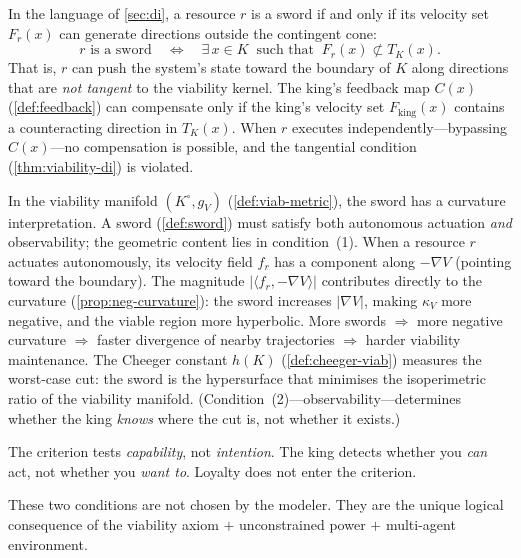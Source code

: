 \begin{remark}\label{rem:sword-di}
In the language of \cref{sec:di}, a resource $r$ is a sword if and
only if its velocity set $F_r(x)$ can generate directions outside
the contingent cone:
\[
  r \text{ is a sword}
  \quad\iff\quad
  \exists\, x \in K \;\;\text{such that}\;\;
  F_r(x) \not\subset T_K(x).
\]
That is, $r$ can push the system's state toward the boundary of $K$
along directions that are \emph{not tangent} to the viability
kernel.  The king's feedback map $C(x)$ (\cref{def:feedback}) can
compensate only if the king's velocity set $F_{\mathrm{king}}(x)$
contains a counteracting direction in $T_K(x)$.  When $r$ executes
independently---bypassing $C(x)$---no compensation is possible,
and the tangential condition (\cref{thm:viability-di}) is violated.
\end{remark}

\begin{remark}
\label{rem:sword-geom}
In the viability manifold $(K^\circ, g_V)$ (\cref{def:viab-metric}),
the sword has a curvature interpretation.  A sword
(\cref{def:sword}) must satisfy both autonomous actuation
\emph{and} observability; the geometric content lies in
condition~(1).  When a resource $r$ actuates autonomously, its
velocity field $f_r$ has a component along $-\nabla V$ (pointing
toward the boundary).  The magnitude
$|\langle f_r, -\nabla V \rangle|$ contributes directly to the
curvature (\cref{prop:neg-curvature}): the sword increases
$|\nabla V|$, making $\kappa_V$ more negative, and the
viable region more hyperbolic.  More swords $\Rightarrow$ more
negative curvature $\Rightarrow$ faster divergence of nearby
trajectories $\Rightarrow$ harder viability maintenance.
The Cheeger constant $h(K)$ (\cref{def:cheeger-viab}) measures
the worst-case cut: the sword is the hypersurface that minimises the
isoperimetric ratio of the viability manifold.
(Condition~(2)---observability---determines whether the king
\emph{knows} where the cut is, not whether it exists.)
\end{remark}

\begin{remark}\label{rem:intent}
The criterion tests \emph{capability}, not \emph{intention}. The king
detects whether you \emph{can} act, not whether you \emph{want to}.
Loyalty does not enter the criterion.
\end{remark}

\begin{remark}\label{rem:necessity}
These two conditions are not chosen by the modeler. They are the unique
logical consequence of the viability axiom $+$ unconstrained power $+$
multi-agent environment.
\end{remark}

